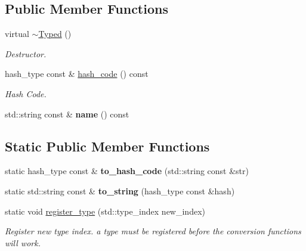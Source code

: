 \subsection*{\-Public \-Member \-Functions}
\begin{DoxyCompactItemize}
\item 
\hypertarget{classNeb_1_1Typed_ac7a0fd653ad4c09abc20fc9f24942042}{virtual \hyperlink{classNeb_1_1Typed_ac7a0fd653ad4c09abc20fc9f24942042}{$\sim$\-Typed} ()}\label{classNeb_1_1Typed_ac7a0fd653ad4c09abc20fc9f24942042}

\begin{DoxyCompactList}\small\item\em \-Destructor. \end{DoxyCompactList}\item 
\hypertarget{classNeb_1_1Typed_af32707079ebb9e68b2def3d2e334b661}{hash\-\_\-type const \& \hyperlink{classNeb_1_1Typed_af32707079ebb9e68b2def3d2e334b661}{hash\-\_\-code} () const }\label{classNeb_1_1Typed_af32707079ebb9e68b2def3d2e334b661}

\begin{DoxyCompactList}\small\item\em \-Hash \-Code. \end{DoxyCompactList}\item 
\hypertarget{classNeb_1_1Typed_ac14568e450df58aa9379966e19edeb87}{std\-::string const \& {\bfseries name} () const }\label{classNeb_1_1Typed_ac14568e450df58aa9379966e19edeb87}

\end{DoxyCompactItemize}
\subsection*{\-Static \-Public \-Member \-Functions}
\begin{DoxyCompactItemize}
\item 
\hypertarget{classNeb_1_1Typed_a6f742a935083c88cfca3ca6532bed215}{static hash\-\_\-type const \& {\bfseries to\-\_\-hash\-\_\-code} (std\-::string const \&str)}\label{classNeb_1_1Typed_a6f742a935083c88cfca3ca6532bed215}

\item 
\hypertarget{classNeb_1_1Typed_aa67110641dab6b84fb39df31317a097f}{static std\-::string const \& {\bfseries to\-\_\-string} (hash\-\_\-type const \&hash)}\label{classNeb_1_1Typed_aa67110641dab6b84fb39df31317a097f}

\item 
\hypertarget{classNeb_1_1Typed_adf1adc534a150147904cf95ae6e562b6}{static void \hyperlink{classNeb_1_1Typed_adf1adc534a150147904cf95ae6e562b6}{register\-\_\-type} (std\-::type\-\_\-index new\-\_\-index)}\label{classNeb_1_1Typed_adf1adc534a150147904cf95ae6e562b6}

\begin{DoxyCompactList}\small\item\em \-Register new type index. a type must be registered before the conversion functions will work. \end{DoxyCompactList}\end{DoxyCompactItemize}
